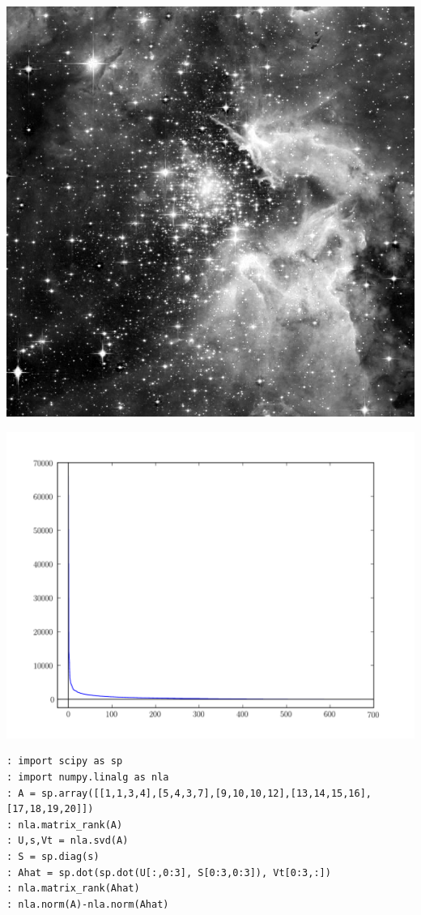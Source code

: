 \begin{center}
\includegraphics[scale=.2]{hubble_red.png}

\includegraphics[scale=.4]{hubble_svals.pdf}
\end{center}

\begin{lstlisting}[style=python]
: import scipy as sp
: import numpy.linalg as nla
: A = sp.array([[1,1,3,4],[5,4,3,7],[9,10,10,12],[13,14,15,16],[17,18,19,20]])
: nla.matrix_rank(A)
: U,s,Vt = nla.svd(A)
: S = sp.diag(s)
: Ahat = sp.dot(sp.dot(U[:,0:3], S[0:3,0:3]), Vt[0:3,:])
: nla.matrix_rank(Ahat)
: nla.norm(A)-nla.norm(Ahat)
\end{lstlisting}

